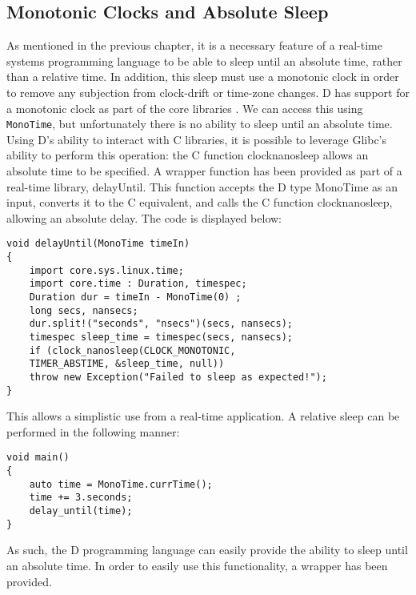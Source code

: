 \subsection{Monotonic Clocks and Absolute Sleep}
As mentioned in the previous chapter, it is a necessary feature of a real-time 
systems programming language to be able to sleep until an absolute time, rather 
than a relative time. In addition, this sleep must use a monotonic clock in order 
to remove any subjection from clock-drift or time-zone changes. D has support 
for a monotonic clock as part of the core libraries 
\cite{dlang-core-time}. We can access this using 
\texttt{MonoTime}, but unfortunately there is no ability to sleep until an 
absolute time. Using D's ability to interact with C libraries, it is possible 
to leverage Glibc's ability to perform this operation: the C function 
clock\textunderscore{}nanosleep allows an absolute time to be specified.
\cite{clock-nanosleep}
A wrapper function has been provided as part of a real-time library, delayUntil. 
This function accepts the D type MonoTime as an input, converts it to the C 
equivalent, and calls the C function clock\textunderscore{}nanosleep, allowing an absolute delay.
The code is displayed below: 
\begin{lstlisting}
void delayUntil(MonoTime timeIn)
{
    import core.sys.linux.time; 
    import core.time : Duration, timespec; 
    Duration dur = timeIn - MonoTime(0) ;
    long secs, nansecs; 
    dur.split!("seconds", "nsecs")(secs, nansecs); 
    timespec sleep_time = timespec(secs, nansecs); 
    if (clock_nanosleep(CLOCK_MONOTONIC, 
    TIMER_ABSTIME, &sleep_time, null))
    throw new Exception("Failed to sleep as expected!"); 
}
\end{lstlisting}
This allows a simplistic use from a real-time application. A relative sleep can 
be performed in the following manner: 
\begin{lstlisting}
void main()
{
    auto time = MonoTime.currTime(); 
    time += 3.seconds; 
    delay_until(time);
}
\end{lstlisting}
As such, the D programming language can easily provide the ability to sleep 
until an absolute time. In order to easily use this functionality, a 
wrapper has been provided.

